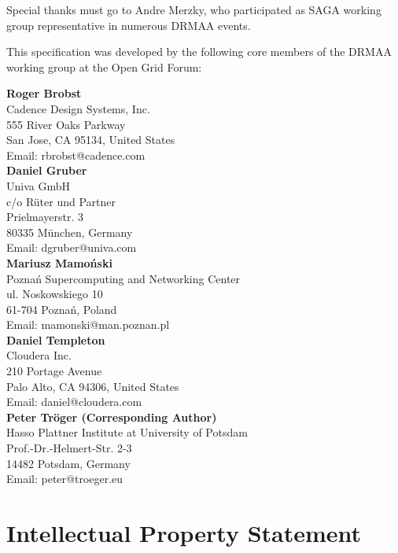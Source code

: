 \documentclass{article}
\begin{document}
Special thanks must go to Andre Merzky, who participated as SAGA working group representative in numerous DRMAA events. 

This specification was developed by the following core members of the DRMAA working group at the Open Grid Forum:

\textbf{Roger Brobst}\\
Cadence Design Systems, Inc.\\
555 River Oaks Parkway \\
San Jose, CA 95134, United States\\
Email: rbrobst@cadence.com\\  

\textbf{Daniel Gruber}\\
Univa GmbH\\
c/o Rüter und Partner\\
Prielmayerstr. 3\\
80335 München, Germany\\
Email: dgruber@univa.com\\

\textbf{Mariusz Mamoński}\\
Poznań Supercomputing and Networking Center\\
ul. Noskowskiego 10\\
61-704 Poznań, Poland\\
Email: mamonski@man.poznan.pl\\ 

\textbf{Daniel Templeton} \\
Cloudera Inc.\\
210 Portage Avenue\\
Palo Alto, CA 94306, United States\\
Email: daniel@cloudera.com\\

\textbf{Peter Tröger (Corresponding Author)} \\
Hasso Plattner Institute at University of Potsdam \\
Prof.-Dr.-Helmert-Str. 2-3 \\
14482 Potsdam, Germany \\
Email: peter@troeger.eu \\


\section{Intellectual Property Statement}
\end{document}
